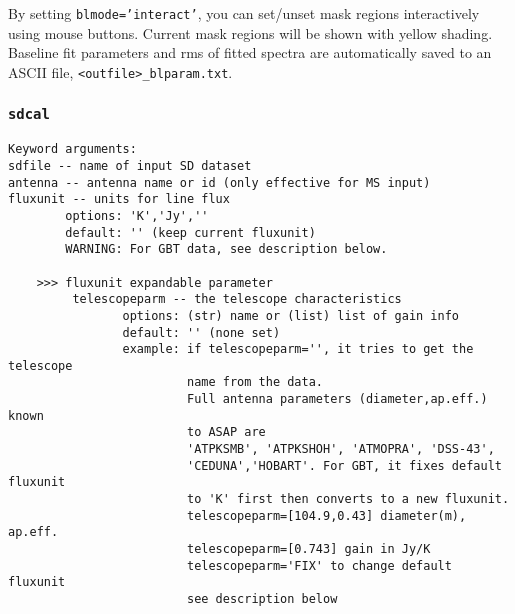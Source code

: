     By setting {\tt blmode='interact'}, you can set/unset mask regions interactively using
    mouse buttons. Current mask regions will be shown with yellow shading.
    Baseline fit parameters and rms of fitted spectra are automatically saved to an
    ASCII file, {\tt <outfile>\_blparam.txt}.

  
\subsubsection{{\tt sdcal}}
\label{section:sd.sdtasks.tasks.sdcal}

\begin{verbatim}
Keyword arguments:
sdfile -- name of input SD dataset
antenna -- antenna name or id (only effective for MS input)
fluxunit -- units for line flux
        options: 'K','Jy',''
        default: '' (keep current fluxunit)
        WARNING: For GBT data, see description below.
        
    >>> fluxunit expandable parameter
         telescopeparm -- the telescope characteristics
                options: (str) name or (list) list of gain info
                default: '' (none set)
                example: if telescopeparm='', it tries to get the telescope
                         name from the data.
                         Full antenna parameters (diameter,ap.eff.) known
                         to ASAP are
                         'ATPKSMB', 'ATPKSHOH', 'ATMOPRA', 'DSS-43',
                         'CEDUNA','HOBART'. For GBT, it fixes default fluxunit
                         to 'K' first then converts to a new fluxunit.
                         telescopeparm=[104.9,0.43] diameter(m), ap.eff.
                         telescopeparm=[0.743] gain in Jy/K
                         telescopeparm='FIX' to change default fluxunit
                         see description below


\end{verbatim}
